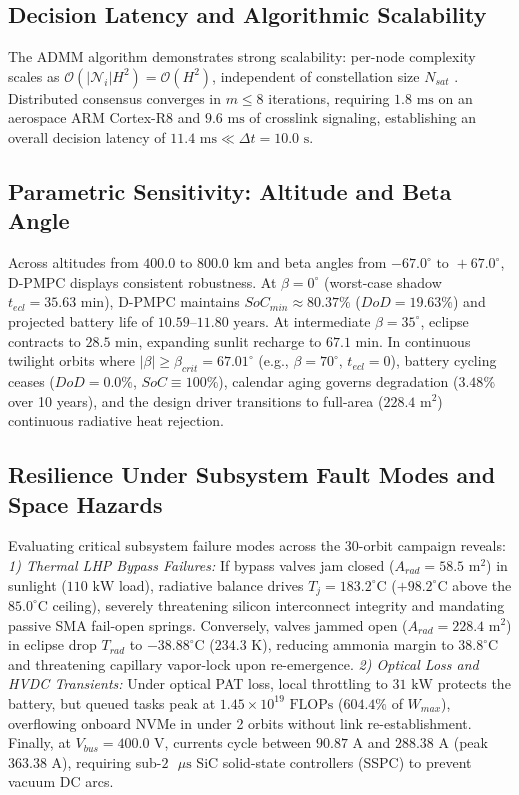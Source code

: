\documentclass[journal]{IEEEtran}
\begin{document}
\subsection{Decision Latency and Algorithmic Scalability}
The ADMM algorithm demonstrates strong scalability: per-node complexity scales as $\mathcal{O}(|\mathcal{N}_i| H^2) = \mathcal{O}(H^2)$, independent of constellation size $N_{sat}$ \cite{boyd2011distributed, giselsson2014improved, nedic2009distributed}. Distributed consensus converges in $m \le 8$ iterations, requiring $1.8\text{ ms}$ on an aerospace ARM Cortex-R8 and $9.6\text{ ms}$ of crosslink signaling, establishing an overall decision latency of $11.4\text{ ms} \ll \Delta t = 10.0\text{ s}$.

\subsection{Parametric Sensitivity: Altitude and Beta Angle}
Across altitudes from $400.0\text{ to }800.0\text{ km}$ and beta angles from $-67.0^\circ\text{ to }+67.0^\circ$, D-PMPC displays consistent robustness. At $\beta = 0^\circ$ (worst-case shadow $t_{ecl} = 35.63\text{ min}$), D-PMPC maintains $SoC_{min} \approx 80.37\%$ ($DoD = 19.63\%$) and projected battery life of $10.59\text{--}11.80\text{ years}$. At intermediate $\beta = 35^\circ$, eclipse contracts to $28.5\text{ min}$, expanding sunlit recharge to $67.1\text{ min}$. In continuous twilight orbits where $|\beta| \ge \beta_{crit} = 67.01^\circ$ (e.g., $\beta = 70^\circ$, $t_{ecl} = 0$), battery cycling ceases ($DoD = 0.0\%$, $SoC \equiv 100\%$), calendar aging governs degradation ($3.48\%$ over 10 years), and the design driver transitions to full-area ($228.4\text{ m}^2$) continuous radiative heat rejection.

\subsection{Resilience Under Subsystem Fault Modes and Space Hazards}
Evaluating critical subsystem failure modes across the 30-orbit campaign reveals: \textit{1) Thermal LHP Bypass Failures:} If bypass valves jam closed ($A_{rad} = 58.5\text{ m}^2$) in sunlight ($110\text{ kW}$ load), radiative balance drives $T_j = 183.2^\circ\text{C}$ ($+98.2^\circ\text{C}$ above the $85.0^\circ\text{C}$ ceiling), severely threatening silicon interconnect integrity and mandating passive SMA fail-open springs. Conversely, valves jammed open ($A_{rad} = 228.4\text{ m}^2$) in eclipse drop $T_{rad}$ to $-38.88^\circ\text{C}$ ($234.3\text{ K}$), reducing ammonia margin to $38.8^\circ\text{C}$ and threatening capillary vapor-lock upon re-emergence.
\textit{2) Optical Loss and HVDC Transients:} Under optical PAT loss, local throttling to $31\text{ kW}$ protects the battery, but queued tasks peak at $1.45 \times 10^{19}\text{ FLOPs}$ ($604.4\%$ of $W_{max}$), overflowing onboard NVMe in under 2 orbits without link re-establishment. Finally, at $V_{bus} = 400.0\text{ V}$, currents cycle between $90.87\text{ A}$ and $288.38\text{ A}$ (peak $363.38\text{ A}$), requiring sub-$2\text{ }\mu\text{s}$ SiC solid-state controllers (SSPC) to prevent vacuum DC arcs.
\end{document}

